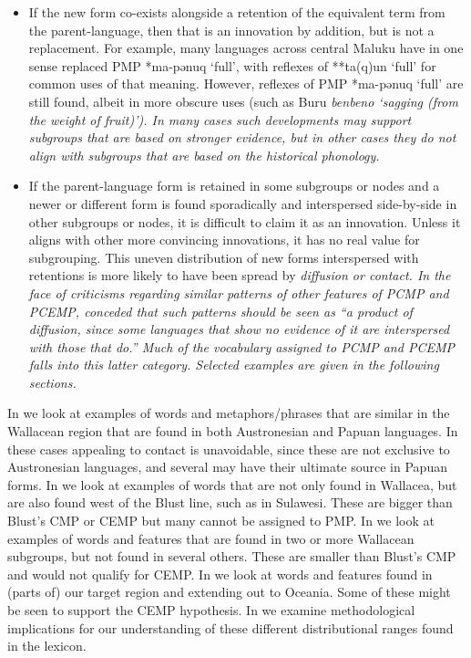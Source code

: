 \begin{itemize}
	\item	If the new form co-exists alongside a retention of the equivalent
				term from the parent-language,
				then that is an innovation by addition,
				but is not a replacement.
				For example, many languages across central Maluku have in one
				sense replaced PMP *ma-pənuq ‘full’,
				with reflexes of **ta(q)un ‘full’ for common uses of that meaning.
				However, reflexes of PMP *ma-pənuq ‘full’ are still found,
				albeit in more obscure uses (such as Buru \it{ben{\tl}beno} ‘sagging
				(from the weight of fruit)’).
				In many cases such developments may support subgroups that are
				based on stronger evidence,
				but in other cases they do not align with subgroups that are
				based on the historical phonology.

	\item	If the parent-language form is retained in some subgroups or
				nodes and a newer or different form is found sporadically
				and interspersed side-by-side in other subgroups or nodes,
				it is difficult to claim it as an innovation.
				Unless it aligns with other more convincing innovations,
				it has no real value for subgrouping.
				This uneven distribution of new forms interspersed with retentions
				is more likely to have been spread by \it{diffusion} or contact.
				In the face of criticisms regarding similar patterns of other
				features of PCMP and PCEMP, \citet[72]{Blust2009} conceded that such patterns
				should be seen as “a product of diffusion,
				since some languages that show no evidence of it are interspersed
				with those that do.” Much of the vocabulary assigned to PCMP
				and PCEMP falls into this latter category.
				Selected examples are given in the following sections.	
\end{itemize}

In  we look at examples of words
and metaphors/phrases that are similar in the Wallacean
region that are found in both Austronesian and Papuan languages.
In these cases appealing to contact is unavoidable,
since these are not exclusive to Austronesian languages,
and several may have their ultimate source in Papuan forms.
In  we look at examples of words that are not only
found in Wallacea, but are also found west of the Blust line,
such as in Sulawesi.
These are bigger than Blust's CMP or CEMP but many cannot be assigned to PMP.
In  we look at examples of words
and features that are found in two or more Wallacean subgroups,
but not found in several others.
These are smaller than Blust's CMP and would not qualify for CEMP.
In  we look at words
and features found in (parts of) our target region
and extending out to Oceania.
Some of these might be seen to support the CEMP hypothesis.
In  we examine methodological implications for
our understanding of these different distributional ranges found
in the lexicon.